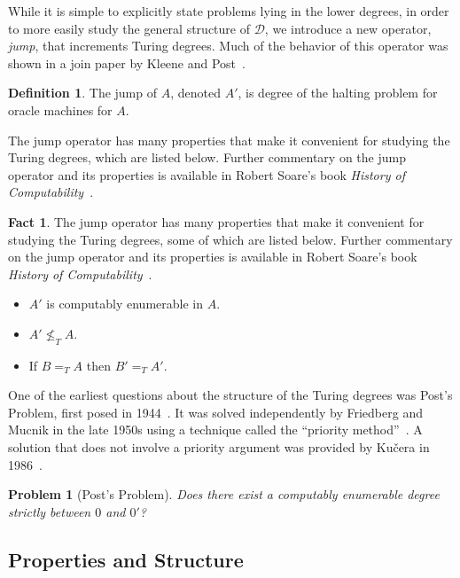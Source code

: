 \documentclass[psamsfonts]{amsart}
\newtheorem{prob}[thm]{Problem}
\theoremstyle{definition}
\newtheorem{defn}[thm]{Definition}
\newtheorem{fact}[thm]{Fact}
\theoremstyle{remark}
\numberwithin{equation}{section}
\begin{document}
While it is simple to explicitly state problems lying in the lower degrees,
in order to more easily study the general structure of $\mathcal{D}$, we
introduce a new operator, \emph{jump}, that increments Turing degrees. Much of
the behavior of this operator was shown in a join paper by Kleene and Post~\cite{kleene54_upper_semi_lattic_degrees_recur_unsol}.

\begin{defn}
  The jump of $A$, denoted $A'$, is degree of the halting problem for oracle
  machines for $A$.
\end{defn}

The jump operator has many properties that make it convenient for studying the
Turing degrees, which are listed below. Further commentary on the jump operator
and its properties is available in Robert Soare's book \emph{History of Computability}~\cite{soare16_turin_comput}.
\begin{fact}
  The jump operator has many properties that make it convenient for studying the
Turing degrees, some of which are listed below. Further commentary on the jump operator
and its properties is available in Robert Soare's book \emph{History of Computability}~\cite{soare16_turin_comput}.
  \begin{itemize}
  \item $A'$ is computably enumerable in $A$.
  \item $A' \not\leq_T A$.
  \item If $B=_TA$ then $B'=_TA'$.
  \end{itemize}
\end{fact}

One of the earliest questions about the structure of the Turing degrees was
Post's Problem, first posed in 1944~\cite{post44:_recur}. It was solved
independently by Friedberg and Mucnik in the late 1950s using a technique
called the ``priority method''~\cite{Friedberg236, muchnik1956unsolvability}. A solution that does not
involve a priority argument was provided by Ku\v{c}era in 1986~\cite{Kucera:1986:APS:22416.22462}.

\begin{prob}[Post's Problem]  
  Does there exist a computably enumerable degree strictly between $0$ and $0'$?
\end{prob}

\subsection{Properties and Structure}
\end{document}
